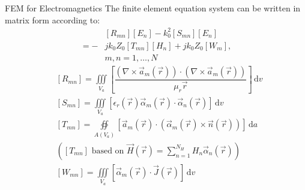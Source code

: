 \begin{info}{FEM for Electromagnetics}
  The finite element equation system can be written in matrix form according to:
  \begin{align*}
    &[R_{mn}][E_{n}] - k_{0}^{2}[S_{mn}][E_{n}]\\
    = -&jk_{0}Z_{0}[T_{mn}][H_{n}] + jk_{0}Z_{0}[W_{m}],\\
    &m, n = 1,\dots,N
  \end{align*}
  \begin{align*}
    &[R_{mn}] = \iiint\limits_{V_{a}}\left[\dfrac{(\nabla\times\vec{a}_{m}(\vec{r}))\cdot(\nabla\times\vec{a}_{m}(\vec{r}))}{\mu_{r}{\vec{r}}}\right]\,\mathrm{d}v\\
    &[S_{mn}] = \iiint\limits_{V_{a}}\left[\epsilon_{r}(\vec{r})\vec{\alpha}_{m}(\vec{r})\cdot\vec{\alpha}_{n}(\vec{r})\right]\,\mathrm{d}v\\
    &[T_{mn}] = \oiint\limits_{A(V_{a})}\left[\vec{a}_{m}(\vec{r})\cdot(\vec{\alpha}_{m}(\vec{r})\times\vec{n}(\vec{r}))\right]\,\mathrm{d}a\\
    &\left([T_{mn}]\text{ based on } \vec{H}(\vec{r}) = \sum\limits_{n=1}^{N_{H}}H_{n}\vec{\alpha}_{n}(\vec{r})\right)\\
    &[W_{mn}] = \iiint\limits_{V_{a}}\left[\vec{\alpha}_{m}(\vec{r})\cdot\vec{J}(\vec{r})\right]\,\mathrm{d}v
  \end{align*}
\end{info}
